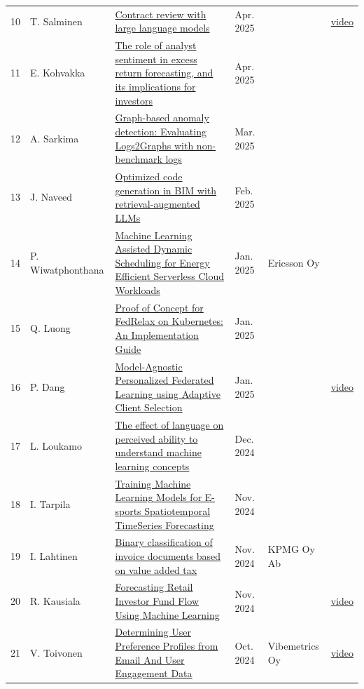 \documentclass[11pt,a4paper]{article}
\begin{document}
\begin{longtable}{@{}r p{2.8cm} p{6.3cm} p{1.6cm} p{2cm} p{1.8cm}@{}}
10 & T. Salminen & \href{https://aaltodoc.aalto.fi/items/8fb83fe1-f44e-4837-9797-0d7e10dcad7e}{Contract review with large language models} & Apr. 2025 &  & \href{https://youtu.be/oAqD7wBkXGk}{video} \\
11 & E. Kohvakka & \href{https://urn.fi/URN:NBN:fi:aalto-202506174917}{The role of analyst sentiment in excess return forecasting, and its implications for investors} & Apr. 2025 &  &  \\
12 & A. Sarkima & \href{https://urn.fi/URN:NBN:fi:aalto-202505203903}{Graph-based anomaly detection: Evaluating Logs2Graphs with non-benchmark logs} & Mar. 2025 &  &  \\
13 & J. Naveed & \href{https://urn.fi/URN:NBN:fi:aalto-202505203933}{Optimized code generation in BIM with retrieval-augmented LLMs} & Feb. 2025 &  &  \\
14 & P. Wiwatphonthana & \href{https://urn.fi/URN:NBN:fi:aalto-202501282068}{Machine Learning Assisted Dynamic Scheduling for Energy Efficient Serverless Cloud Workloads} & Jan. 2025 & Ericsson Oy &  \\
15 & Q. Luong & \href{https://urn.fi/URN:NBN:fi:aalto-202501282110}{Proof of Concept for FedRelax on Kubernetes: An Implementation Guide} & Jan. 2025 &  &  \\
16 & P. Dang & \href{https://urn.fi/URN:NBN:fi:aalto-202501302237}{Model-Agnostic Personalized Federated Learning using Adaptive Client Selection} & Jan. 2025 &  & \href{https://youtu.be/JiAhFSQ-8yY}{video} \\
17 & L. Loukamo & \href{https://urn.fi/URN:NBN:fi:aalto-202502072365}{The effect of language on perceived ability to understand machine learning concepts} & Dec. 2024 &  &  \\
18 & I. Tarpila & \href{https://urn.fi/URN:NBN:fi:aalto-202412177981}{Training Machine Learning Models for E-sports Spatiotemporal TimeSeries Forecasting} & Nov. 2024 &  &  \\
19 & I. Lahtinen & \href{https://urn.fi/URN:NBN:fi:aalto-202412178013}{Binary classification of invoice documents based on value added tax} & Nov. 2024 & KPMG Oy Ab &  \\
20 & R. Kausiala & \href{https://urn.fi/URN:NBN:fi:aalto-202412177992}{Forecasting Retail Investor Fund Flow Using Machine Learning} & Nov. 2024 &  & \href{https://youtu.be/OX-Ftkk_K8Q}{video} \\
21 & V. Toivonen & \href{https://urn.fi/URN:NBN:fi:aalto-202412178014}{Determining User Preference Profiles from Email And User Engagement Data} & Oct. 2024 & Vibemetrics Oy & \href{https://youtu.be/lUGZz_SHttY}{video} \\

\end{longtable}
\end{document}
